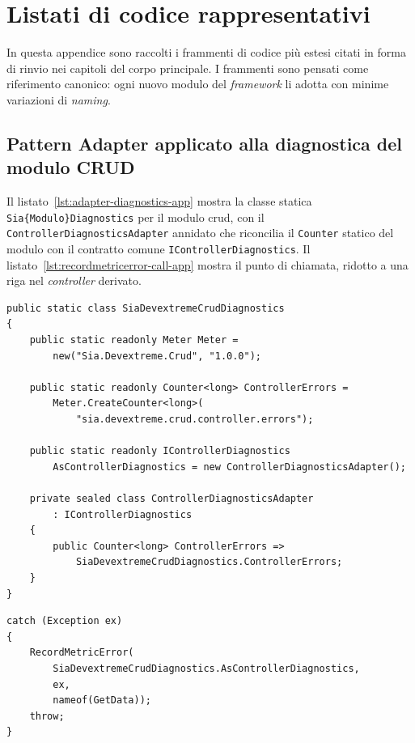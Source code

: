 \chapter{Listati di codice rappresentativi}
\label{app:listati}

In questa appendice sono raccolti i frammenti di codice più estesi citati in
forma di rinvio nei capitoli del corpo principale. I frammenti sono pensati
come riferimento canonico: ogni nuovo modulo del \emph{framework} li adotta
con minime variazioni di \emph{naming}.

\section{Pattern Adapter applicato alla diagnostica del modulo CRUD}
\label{app:listing-adapter}

Il listato~\ref{lst:adapter-diagnostics-app} mostra la classe statica
\texttt{Sia\{Modulo\}Diagnostics} per il modulo \gls{crud}, con il
\texttt{ControllerDiagnosticsAdapter} annidato che riconcilia il
\texttt{Counter} statico del modulo con il contratto comune
\texttt{IControllerDiagnostics}. Il listato~\ref{lst:recordmetricerror-call-app}
mostra il punto di chiamata, ridotto a una riga nel \emph{controller}
derivato.

\begin{lstlisting}[language={[Sharp]C},
  caption={Pattern Adapter applicato alla diagnostica del modulo CRUD},
  label=lst:adapter-diagnostics-app]
public static class SiaDevextremeCrudDiagnostics
{
    public static readonly Meter Meter =
        new("Sia.Devextreme.Crud", "1.0.0");

    public static readonly Counter<long> ControllerErrors =
        Meter.CreateCounter<long>(
            "sia.devextreme.crud.controller.errors");

    public static readonly IControllerDiagnostics
        AsControllerDiagnostics = new ControllerDiagnosticsAdapter();

    private sealed class ControllerDiagnosticsAdapter
        : IControllerDiagnostics
    {
        public Counter<long> ControllerErrors =>
            SiaDevextremeCrudDiagnostics.ControllerErrors;
    }
}
\end{lstlisting}

\begin{lstlisting}[language={[Sharp]C},
  caption={Invocazione di \texttt{RecordMetricError} dal controller derivato},
  label=lst:recordmetricerror-call-app]
catch (Exception ex)
{
    RecordMetricError(
        SiaDevextremeCrudDiagnostics.AsControllerDiagnostics,
        ex,
        nameof(GetData));
    throw;
}
\end{lstlisting}
